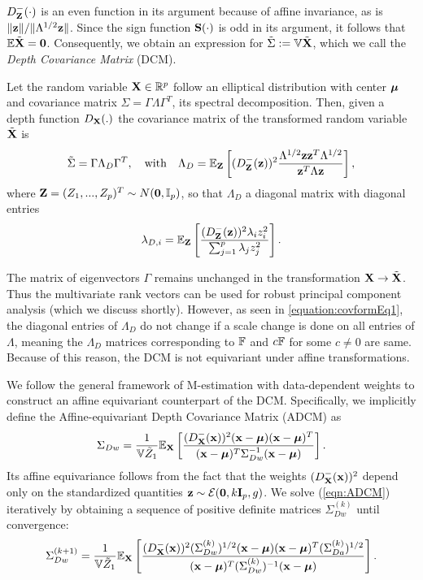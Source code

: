 $D^-_{\mathbf{Z}}(\cdot)$ is an even function in its argument because of affine invariance, as is $\| {\bf{z}} \| / \|\Lambda^{1/2} {\bf{z}} \|$. Since the sign function ${\mathbf{S}}(\cdot)$ is odd in its argument, it follows that ${\mathbb{E}} \tilde {{\mathbf{X}}} = \bf0$. Consequently, we obtain an expression for $\tilde \Sigma := {\mathbb{V}} \tilde {{\mathbf{X}}}$, which we call the {\it Depth Covariance Matrix} (DCM).

\begin{Theorem} \label{Theorem:covform}
Let the random variable ${\mathbf{X}} \in \mathbb{R}^p$ follow an elliptical distribution with center ${\boldsymbol{\mu}}$ and covariance matrix $\Sigma = \Gamma\Lambda\Gamma^T$, its spectral decomposition. Then, given a depth function $D_{\mathbf{X}}(.)$ the covariance matrix of the transformed random variable $\tilde{{\mathbf{X}}}$ is
\begin{equation} \label{equation:covformEq1}
\tilde \Sigma = \Gamma \Lambda_{D} \Gamma^T,\quad\mbox{with}\quad \Lambda_{D} = \mathbb E_{\mathbf{Z}} \left[ (D^-_{\mathbf{Z}}({\bf{z}}))^2 \frac{\Lambda^{1/2} {\bf{z}} {\bf{z}}^T \Lambda^{1/2}}{{\bf{z}}^T \Lambda {\bf{z}}} \right],
\end{equation}
where ${\mathbf{Z}} = (Z_1,...,Z_p)^T \sim N({\bf 0}, {\mathbb{I}}_p)$, so that $\Lambda_{D}$ a diagonal matrix with diagonal entries
%
$$
\lambda_{D,i} = \mathbb E_{\mathbf{Z}} \left[ \frac{(D^-_{\mathbf{Z}}({\bf{z}}))^2 \lambda_i z_i^2}{\sum_{j=1}^p \lambda_j z_j^2} \right].
$$
\end{Theorem}

The matrix of eigenvectors $\Gamma$ remains unchanged in the transformation ${\mathbf{X}} \rightarrow \tilde {{\mathbf{X}}}$. Thus the multivariate rank vectors can be used for robust principal component analysis (which we discuss shortly). However, as seen in \eqref{equation:covformEq1}, the diagonal entries of $\Lambda_{D}$ do not change if a scale change is done on all entries of $\Lambda$, meaning the $\Lambda_{D}$ matrices corresponding to ${\mathbb{F}}$ and $c {\mathbb{F}}$ for some $c \neq 0$ are same. Because of this reason, the DCM is not equivariant under affine transformations.

We follow the general framework of M-estimation with data-dependent weights \citep{HuberBook81} to construct an affine equivariant counterpart of the DCM. Specifically, we implicitly define the Affine-equivariant Depth Covariance Matrix (ADCM) as
%
\begin{equation} \label{eqn:ADCM}
\Sigma_{Dw} = \frac{1}{ {\mathbb{V}} \tilde Z_1 } {\mathbb{E}}_{\mathbf{X}} \left[ \frac{(D^-_{\mathbf{X}}({\bf{x}}))^2 ({\bf{x}} - {\boldsymbol{\mu}}) ({\bf{x}} - {\boldsymbol{\mu}})^T}{({\bf{x}} - {\boldsymbol{\mu}})^T \Sigma_{Dw}^{-1} ({\bf{x}} - {\boldsymbol{\mu}})} \right].
\end{equation}
%
Its affine equivariance follows from the fact that the weights $(D^-_{\mathbf{X}} ({\bf{x}}))^2$ depend only on the standardized quantities ${\bf{z}} \sim \mathcal{E} ({\bf 0}, k {\mathbf{I}}_p, g)$. We solve (\ref{eqn:ADCM}) iteratively by obtaining a sequence of positive definite matrices $\Sigma^{(k)}_{Dw}$ until convergence:
%
$$
\Sigma^{(k+1)}_{Dw} = \frac{1}{{\mathbb{V}} \tilde Z_1 } {\mathbb{E}}_{\mathbf{X}} \left[ \frac{(D^-_{\mathbf{X}}({\bf{x}}))^2 (\Sigma^{(k)}_{Dw})^{1/2} ({\bf{x}} - {\boldsymbol{\mu}}) ({\bf{x}} - {\boldsymbol{\mu}})^T (\Sigma^{(k)}_{Da})^{1/2}}{({\bf{x}} - {\boldsymbol{\mu}})^T (\Sigma^{(k)}_{Dw})^{-1} ({\bf{x}} - {\boldsymbol{\mu}})} \right].
$$
%

